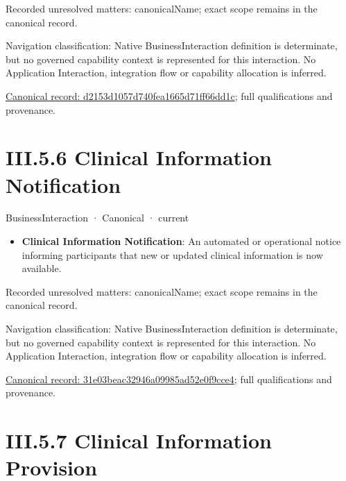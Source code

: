 {\small Recorded unresolved matters: canonicalName; exact scope remains in the canonical record.}\par
{\small Navigation classification: Native BusinessInteraction definition is determinate, but no governed capability context is represented for this interaction. No Application Interaction, integration flow or capability allocation is inferred.}\par
{\footnotesize \href{../../../../continuum/business/business-interaction/d2153d1057d740fea1665d71ff66dd1c.md}{Canonical record: d2153d1057d740fea1665d71ff66dd1c}; full qualifications and provenance.}\par
\section*{III.5.6 Clinical Information Notification}
\label{navigation:III.5.6}

\label{element:31e03beac32946a09985ad52e0f9cce4}
{\small BusinessInteraction · Canonical · current}\par

\begin{itemize}


\item \textbf{Clinical Information Notification}: An automated or operational notice informing participants that new or updated clinical information is now available.

\end{itemize}

{\small Recorded unresolved matters: canonicalName; exact scope remains in the canonical record.}\par
{\small Navigation classification: Native BusinessInteraction definition is determinate, but no governed capability context is represented for this interaction. No Application Interaction, integration flow or capability allocation is inferred.}\par
{\footnotesize \href{../../../../continuum/business/business-interaction/31e03beac32946a09985ad52e0f9cce4.md}{Canonical record: 31e03beac32946a09985ad52e0f9cce4}; full qualifications and provenance.}\par
\section*{III.5.7 Clinical Information Provision}
\label{navigation:III.5.7}

